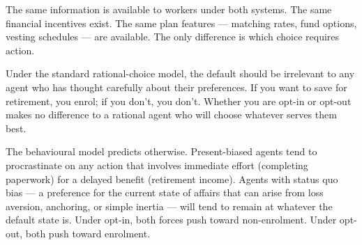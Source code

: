 \documentclass[12pt, letterpaper]{article}
\begin{document}
The same information is available to workers under both systems. The same financial incentives exist. The same plan features --- matching rates, fund options, vesting schedules --- are available. The only difference is which choice requires action.

Under the standard rational-choice model, the default should be irrelevant to any agent who has thought carefully about their preferences. If you want to save for retirement, you enrol; if you don't, you don't. Whether you are opt-in or opt-out makes no difference to a rational agent who will choose whatever serves them best.

The behavioural model predicts otherwise. Present-biased agents tend to procrastinate on any action that involves immediate effort (completing paperwork) for a delayed benefit (retirement income). Agents with status quo bias --- a preference for the current state of affairs that can arise from loss aversion, anchoring, or simple inertia --- will tend to remain at whatever the default state is. Under opt-in, both forces push toward non-enrolment. Under opt-out, both push toward enrolment.
\end{document}
